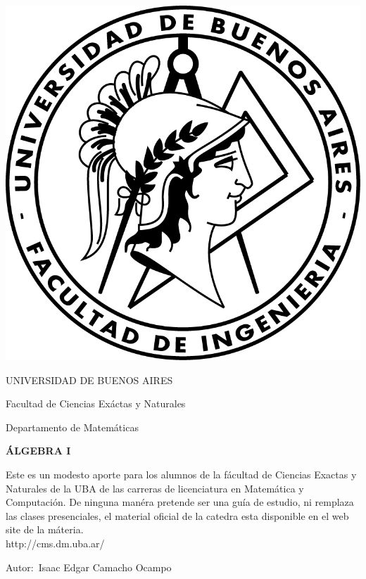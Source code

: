 \documentclass[12pt]{book}
\begin{document}
\thispagestyle{empty}

\begin {center}

\includegraphics[scale=.4]{Logo-fiuba_big.png}

\medskip
UNIVERSIDAD DE BUENOS AIRES

Facultad de Ciencias Ex\'actas y Naturales

Departamento de Matem\'aticas


\vspace{3cm}


\textbf{\large ÁLGEBRA I}

\vspace{2cm}


Este es un modesto aporte para los alumnos de la f\'acultad de Ciencias Exactas y Naturales de la UBA de las carreras de licenciatura en Matemática y Computaci\'on.
De ninguna man\'era pretende ser una gu\'ia de estudio, ni remplaza las clases presenciales, el material oficial de la catedra esta disponible en el web site de la m\'ateria.
\\
http://cms.dm.uba.ar/

\end {center}


\vspace{2.5cm}

\noindent Autor:\,	Isaac Edgar Camacho Ocampo
 
\end{document}
